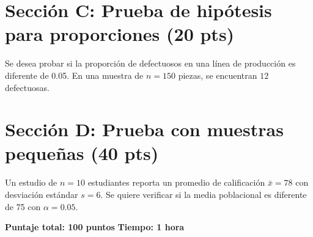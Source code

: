 \documentclass[11pt,a4paper]{exam}
\begin{document}
\begin{questions}
\section*{Sección C: Prueba de hipótesis para proporciones (20 pts)}

\question Se desea probar si la proporción de defectuosos en una línea de producción es diferente de 0.05. En una muestra de $n=150$ piezas, se encuentran $12$ defectuosas.

\section*{Sección D: Prueba con muestras pequeñas (40 pts)}

\question Un estudio de $n=10$ estudiantes reporta un promedio de calificación $\bar{x}=78$ con desviación estándar $s=6$. Se quiere verificar si la media poblacional es diferente de 75 con $\alpha=0.05$.

\end{questions}

\vspace{1cm}
\noindent\textbf{Puntaje total: 100 puntos} \hfill \textbf{Tiempo: 1 hora}
\end{document}
